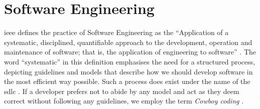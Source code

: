 
\chapter{Software Engineering}

\label{ch:software-engineering}
\acrfull{ieee} defines the practice of Software Engineering as the ``Application of a systematic, disciplined, quantifiable approach to the development, operation and maintenance of software; that is, the application of engineering to software'' \cite[p.~421]{8016712}. The word ``systematic'' in this definition emphasises the need for a structured process, depicting guidelines and models that describe how we should develop software in the most efficient way possible. Such a process does exist under the name of the \acrfull{sdlc} \cite[p.~420]{8016712}. If a developer prefers not to abide by any model and act as they deem correct without following any guidelines, we employ the term \emph{Cowboy coding} \cite[p.~34]{landry2011iterative}.


\clearpage

\newpage


